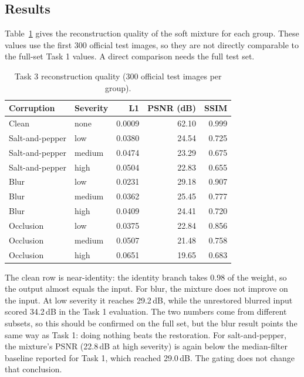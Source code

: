 \documentclass[conference]{IEEEtran}
\begin{document}
\subsection{Results}
Table~\ref{tab:t3recon} gives the reconstruction quality of the soft mixture for each group. These values use
the first 300 official test images, so they are not directly comparable to the full-set Task 1 values. A
direct comparison needs the full test set.

\begin{table}[t]
\centering
\caption{Task 3 reconstruction quality (300 official test images per group).}
\label{tab:t3recon}
\begin{tabular}{@{}llrrr@{}}
\toprule
Corruption & Severity & L1 & PSNR (dB) & SSIM \\
\midrule
Clean & none & 0.0009 & 62.10 & 0.999 \\
Salt-and-pepper & low & 0.0380 & 24.54 & 0.725 \\
Salt-and-pepper & medium & 0.0474 & 23.29 & 0.675 \\
Salt-and-pepper & high & 0.0504 & 22.83 & 0.655 \\
Blur & low & 0.0231 & 29.18 & 0.907 \\
Blur & medium & 0.0362 & 25.45 & 0.777 \\
Blur & high & 0.0409 & 24.41 & 0.720 \\
Occlusion & low & 0.0375 & 22.84 & 0.856 \\
Occlusion & medium & 0.0507 & 21.48 & 0.758 \\
Occlusion & high & 0.0651 & 19.65 & 0.683 \\
\bottomrule
\end{tabular}
\end{table}

The clean row is near-identity: the identity branch takes 0.98 of the weight, so the output almost equals the
input. For blur, the mixture does not improve on the input. At low severity it reaches 29.2\,dB, while the
unrestored blurred input scored 34.2\,dB in the Task 1 evaluation. The two numbers come from different
subsets, so this should be confirmed on the full set, but the blur result points the same way as Task 1:
doing nothing beats the restoration. For salt-and-pepper, the mixture's PSNR (22.8\,dB at high severity) is again below
the median-filter baseline reported for Task 1, which reached 29.0\,dB. The gating does not change that
conclusion.

\end{document}
